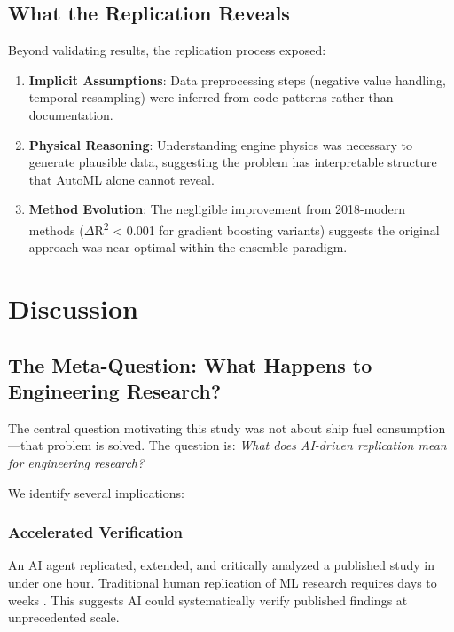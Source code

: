 \documentclass[conference]{IEEEtran}
\begin{document}
\subsection{What the Replication Reveals}

Beyond validating results, the replication process exposed:

\begin{enumerate}
    \item \textbf{Implicit Assumptions}: Data preprocessing steps (negative value handling, temporal resampling) were inferred from code patterns rather than documentation.

    \item \textbf{Physical Reasoning}: Understanding engine physics was necessary to generate plausible data, suggesting the problem has interpretable structure that AutoML alone cannot reveal.

    \item \textbf{Method Evolution}: The negligible improvement from 2018-modern methods ($\Delta$R\textsuperscript{2} < 0.001 for gradient boosting variants) suggests the original approach was near-optimal within the ensemble paradigm.
\end{enumerate}

\section{Discussion}

\subsection{The Meta-Question: What Happens to Engineering Research?}

The central question motivating this study was not about ship fuel consumption---that problem is solved. The question is: \textit{What does AI-driven replication mean for engineering research?}

We identify several implications:

\subsubsection{Accelerated Verification}

An AI agent replicated, extended, and critically analyzed a published study in under one hour. Traditional human replication of ML research requires days to weeks \cite{pineau2020improving}. This suggests AI could systematically verify published findings at unprecedented scale.
\end{document}
